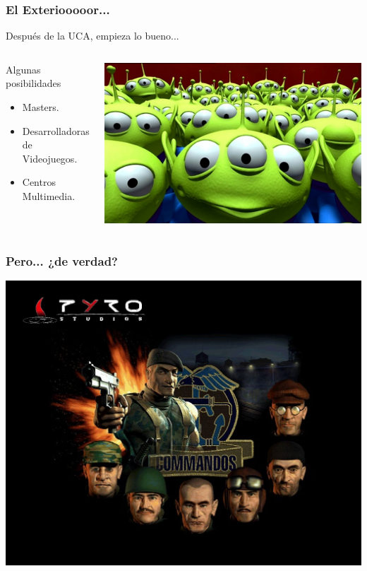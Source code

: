 \begin{frame}
	\frametitle{El Exteriooooor...}
		
	Después de la UCA, empieza lo bueno...
	\newline
	\begin{columns}[c]
		\column{150pt}
			\begin{block}{Algunas posibilidades}
				\begin{itemize}
					\item Masters.
					\item Desarrolladoras de Videojuegos.
					\item Centros Multimedia.
				\end{itemize}
			\end{block}
		\column{150pt}
			\begin{center}
				\includegraphics[scale=0.15]{img/exterior.jpg}
			\end{center}
	\end{columns}
\end{frame}


\begin{frame}
	\frametitle{Pero... ¿de verdad?}
	\begin{center}
		\includegraphics[scale=0.20]{img/comandos.jpeg}
	\end{center}
\end{frame}




